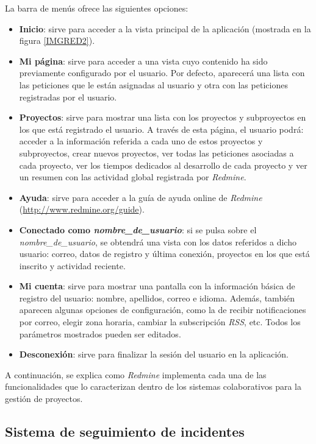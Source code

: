 \documentclass[11pt,a4paper,spanish,twoside]{report}
\begin{document}
La barra de menús ofrece las siguientes opciones:
\begin{itemize}
	\item \textbf{Inicio}: sirve para acceder a la vista principal de la
aplicación (mostrada en la figura \ref{IMGRED2}).
	\item \textbf{Mi página}: sirve para acceder a una vista cuyo contenido ha
sido previamente configurado por el usuario. Por defecto, aparecerá una lista
con las peticiones que le están asignadas al usuario y otra con las peticiones
registradas por el usuario.
	\item \textbf{Proyectos}: sirve para mostrar una lista con los proyectos y
subproyectos en los que está registrado el usuario. A través de esta página,
el usuario podrá: acceder a la información referida a cada uno de estos
proyectos y subproyectos, crear nuevos proyectos, ver todas las peticiones
asociadas a cada proyecto, ver los tiempos dedicados al desarrollo de cada
proyecto y ver un resumen con las actividad global registrada por
\emph{Redmine}.
	\item \textbf{Ayuda}: sirve para acceder a la guía de ayuda online de
\emph{Redmine} (\url{http://www.redmine.org/guide}).
	\item \textbf{Conectado como \emph{nombre\_de\_usuario}}: si se pulsa sobre
el \emph{nombre\_de\_usuario}, se obtendrá una vista con los datos referidos
a dicho usuario: correo, datos de registro y última conexión, proyectos en los
que está inscrito y actividad reciente.
	\item \textbf{Mi cuenta}: sirve para mostrar una pantalla con la información
básica de registro del usuario: nombre, apellidos, correo e idioma. Además,
también aparecen algunas opciones de configuración, como la de recibir
notificaciones por correo, elegir zona horaria, cambiar la subscripción
\emph{RSS}, etc. Todos los parámetros mostrados pueden ser editados.
	\item \textbf{Desconexión}: sirve para finalizar la sesión del usuario en la
aplicación.
\end{itemize}

A continuación, se explica como \emph{Redmine} implementa cada una de las
funcionalidades que lo caracterizan dentro de los sistemas colaborativos para
la gestión de proyectos.

	\subsection{Sistema de seguimiento de incidentes}
\end{document}
